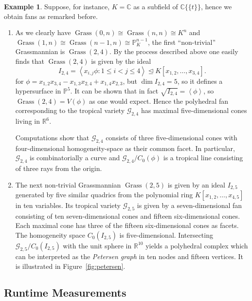 \documentclass[
  paper=a4,
  titlepage,
  bibliography=totoc,
  listof=totoc,
  pagesize=pdftex
]{scrartcl}
\numberwithin{figure}{section}
\numberwithin{equation}{section}
\numberwithin{table}{section}
\newcommand*\setR{\mathds{R}}
\newcommand*\setC{\mathds{C}}
\newcommand*\setP{\mathds{P}}
\newcommand*\ideal[1]{\left\langle #1 \right\rangle}
\newcommand*\puiseux[2]{#1\{\!\{#2\}\!\}}
\newcommand*\CCt{\puiseux{\setC}{t}}
\let\idealof\trianglelefteq
\DeclareMathOperator{\Grass}{Grass}
\theoremstyle{definition}
\newtheorem{example}[definition]{Example}
\numberwithin{definition}{section}
\begin{document}
\begin{example}
  Suppose, for instance, $K = \setC$ as a subfield of $\CCt$, hence we obtain fans as
  remarked before.
  \begin{enumerate}
    \item As we clearly have $\Grass(0,n) \cong \Grass(n,n) \cong K^n$ and $\Grass(1,n)
      \cong \Grass(n-1, n) \cong \setP_K^{n-1}$, the first \enquote{non-trivial}
      Grassmannian is $\Grass(2,4)$. By the process described above one easily finds that
      $\Grass(2,4)$ is given by the ideal
      \[
        I_{2,4} = \ideal{ x_{i,j} \phi : 1 \leq i < j \leq 4 }
        \idealof K[x_{1,2}, \dots, x_{3,4}].
      \]
      for $\phi = x_{1,2}x_{3,4} - x_{1,3}x_{2,4} + x_{1,4}x_{2,3}$, but $\dim I_{2,4} =
      5$, so it defines a hypersurface in $\setP^5$. It can be shown that in fact
      $\sqrt{I_{2,4}} = \ideal \phi$, so $\Grass(2,4) = V(\phi)$ as one would expect.
      Hence the polyhedral fan corresponding to the tropical variety $\mathcal G_{2,4}$
      has maximal five-dimensional cones living in $\setR^6$.

      Computations show that $\mathcal G_{2,4}$ consists of three five-dimensional cones
      with four-dimensional homogeneity-space as their common facet. In particular,
      $\mathcal G_{2,4}$ is combinatorially a curve and $\mathcal G_{2,4}/C_0(\phi)$ is a
      tropical line consisting of three rays from the origin.
    \item The next non-trivial Grassmannian $\Grass(2,5)$ is given by an ideal $I_{2,5}$
      generated by five similar quadrics from the polynomial ring $K[x_{1,2}, \dots,
      x_{4,5}]$ in ten variables. Its tropical variety $\mathcal G_{2,5}$ is given by a
      seven-dimensional fan consisting of ten seven-dimensional cones and fifteen
      six-dimensional cones. Each maximal cone has three of the fifteen six-dimensional
      cones as facets. The homogeneity space $C_0(I_{2,5})$ is five-dimensional.
      Intersecting $\mathcal G_{2,5}/C_0(I_{2,5})$ with the unit sphere in $\setR^{10}$
      yields a polyhedral complex which can be interpreted as the \emph{Petersen graph} in
      ten nodes and fifteen vertices. It is illustrated in Figure~\ref{fig:petersen}.
  \end{enumerate}
\end{example}

\subsection{Runtime Measurements}
\end{document}
